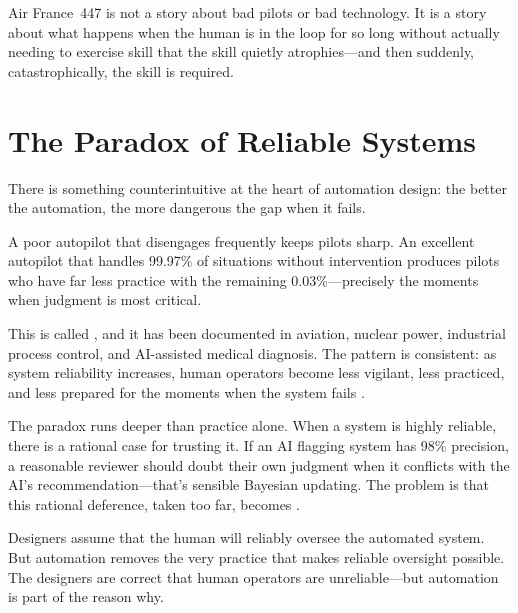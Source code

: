 Air France~447 is not a story about bad pilots or bad technology. It is a story about what happens when the human is in the loop for so long without actually needing to exercise skill that the skill quietly atrophies---and then suddenly, catastrophically, the skill is required.

\section{The Paradox of Reliable Systems}

There is something counterintuitive at the heart of automation design: the better the automation, the more dangerous the gap when it fails.

A poor autopilot that disengages frequently keeps pilots sharp. An excellent autopilot that handles 99.97\% of situations without intervention produces pilots who have far less practice with the remaining 0.03\%---precisely the moments when judgment is most critical.

This is called , and it has been documented in aviation, nuclear power, industrial process control, and AI-assisted medical diagnosis. The pattern is consistent: as system reliability increases, human operators become less vigilant, less practiced, and less prepared for the moments when the system fails \autocite{parasuraman2010complacency}.

The paradox runs deeper than practice alone. When a system is highly reliable, there is a rational case for trusting it. If an AI flagging system has 98\% precision, a reasonable reviewer should doubt their own judgment when it conflicts with the AI's recommendation---that's sensible Bayesian updating. The problem is that this rational deference, taken too far, becomes .

\begin{keyconcept}
Designers assume that the human will reliably oversee the automated system. But automation removes the very practice that makes reliable oversight possible. The designers are correct that human operators are unreliable---but automation is part of the reason why.
\end{keyconcept}

